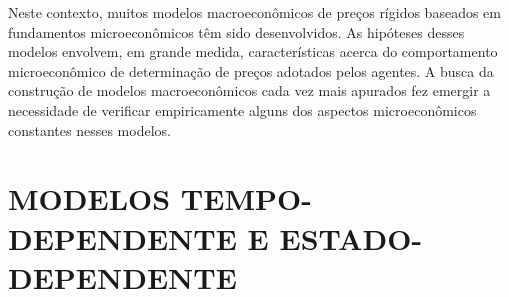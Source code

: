 \documentclass[twoside,a4paper,11pt]{report}
\begin{document}
Neste contexto, muitos modelos macroeconômicos de preços rígidos baseados em fundamentos microeconômicos têm sido desenvolvidos. As hipóteses desses modelos envolvem, em grande medida, características acerca do comportamento microeconômico de determinação de preços adotados pelos agentes. A busca da construção de modelos macroeconômicos cada vez mais apurados fez emergir a necessidade de verificar empiricamente alguns dos aspectos microeconômicos constantes nesses modelos. 

\section*{MODELOS TEMPO-DEPENDENTE E ESTADO-DEPENDENTE}

% 
% 
\end{document}
